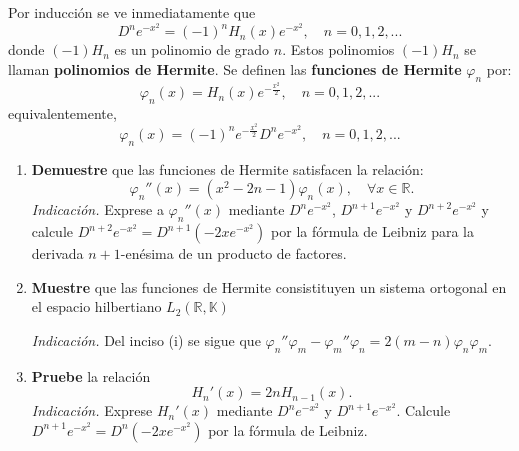 \documentclass[12pt]{report}
\theoremstyle{largebreak}
\begin{document}
    \begin{excer}
        Por inducción se ve inmediatamente que
        \begin{equation*}
            D^ne^{-x^2}=(-1)^nH_n(x)e^{-x^2}, \quad n=0,1,2,...
        \end{equation*}
        donde $(-1)H_n$ es un polinomio de grado $n$. Estos polinomios $(-1)H_n$ se llaman \textbf{polinomios de Hermite}. Se definen las \textbf{funciones de Hermite} $\varphi_n$ por:
        \begin{equation*}
            \varphi_n(x)=H_n(x)e^{-\frac{x^2}{2}},\quad n=0,1,2,...
        \end{equation*}
        equivalentemente,
        \begin{equation*}
            \varphi_n(x)=(-1)^ne^{-\frac{x^2}{2}}D^ne^{-x^2},\quad n=0,1,2,...
        \end{equation*}
        \begin{enumerate}
            \item \textbf{Demuestre} que las funciones de Hermite satisfacen la relación:
            \begin{equation*}
                \varphi_n''(x)=(x^2-2n-1)\varphi_n(x),\quad\forall x\in\mathbb{R}.
            \end{equation*}
            \textit{Indicación.} Exprese a $\varphi_n''(x)$ mediante $D^ne^{-x^2}$, $D^{n+1}e^{-x^2}$ y $D^{n+2}e^{-x^2}$ y calcule $D^{n+2}e^{-x^2}=D^{n+1}(-2xe^{-x^2})$ por la fórmula de Leibniz para la derivada $n+1$-enésima de un producto de factores.

            \item \textbf{Muestre} que las funciones de Hermite consistituyen un sistema ortogonal en el espacio hilbertiano $L_2(\mathbb{R},\mathbb{K})$
            
            \textit{Indicación.} Del inciso (i) se sigue que $\varphi_n''\varphi_m-\varphi_m''\varphi_n=2(m-n)\varphi_n\varphi_m$.

            \item \textbf{Pruebe} la relación
            \begin{equation*}
                H_n'(x)=2nH_{n-1}(x).
            \end{equation*}
            \textit{Indicación.} Exprese $H_n'(x)$ mediante $D^ne^{-x^2}$ y $D^{n+1}e^{-x^2}$. Calcule $D^{n+1}e^{-x^2}=D^n(-2xe^{-x^2})$ por la fórmula de Leibniz.


\end{enumerate}
\end{excer}
\end{document}
